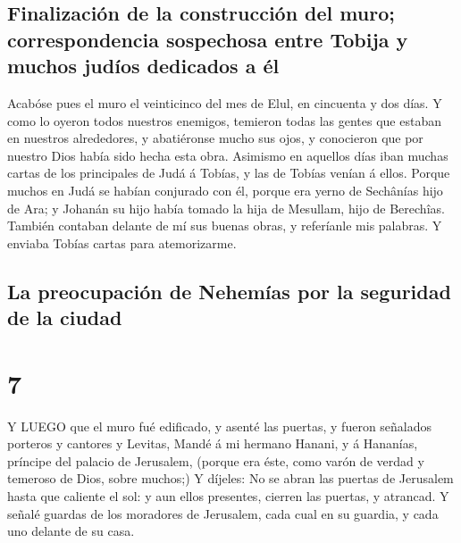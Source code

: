 \hypertarget{finalizaciuxf3n-de-la-construcciuxf3n-del-muro-correspondencia-sospechosa-entre-tobija-y-muchos-juduxedos-dedicados-a-uxe9l}{%
\subsection{Finalización de la construcción del muro; correspondencia
sospechosa entre Tobija y muchos judíos dedicados a
él}\label{finalizaciuxf3n-de-la-construcciuxf3n-del-muro-correspondencia-sospechosa-entre-tobija-y-muchos-juduxedos-dedicados-a-uxe9l}}

 Acabóse pues el muro el veinticinco del mes de Elul, en
cincuenta y dos días.  Y como lo oyeron todos nuestros
enemigos, temieron todas las gentes que estaban en nuestros alrededores,
y abatiéronse mucho sus ojos, y conocieron que por nuestro Dios había
sido hecha esta obra.  Asimismo en aquellos días iban
muchas cartas de los principales de Judá á Tobías, y las de Tobías
venían á ellos.  Porque muchos en Judá se habían conjurado
con él, porque era yerno de Sechânías hijo de Ara; y Johanán su hijo
había tomado la hija de Mesullam, hijo de Berechîas. 
También contaban delante de mí sus buenas obras, y referíanle mis
palabras. Y enviaba Tobías cartas para atemorizarme.

\hypertarget{la-preocupaciuxf3n-de-nehemuxedas-por-la-seguridad-de-la-ciudad}{%
\subsection{La preocupación de Nehemías por la seguridad de la
ciudad}\label{la-preocupaciuxf3n-de-nehemuxedas-por-la-seguridad-de-la-ciudad}}

\hypertarget{section-6}{%
\section{7}\label{section-6}}

 Y LUEGO que el muro fué edificado, y asenté las puertas, y
fueron señalados porteros y cantores y Levitas,  Mandé á mi
hermano Hanani, y á Hananías, príncipe del palacio de Jerusalem, (porque
era éste, como varón de verdad y temeroso de Dios, sobre muchos;)
 Y díjeles: No se abran las puertas de Jerusalem hasta que
caliente el sol: y aun ellos presentes, cierren las puertas, y atrancad.
Y señalé guardas de los moradores de Jerusalem, cada cual en su guardia,
y cada uno delante de su casa.

